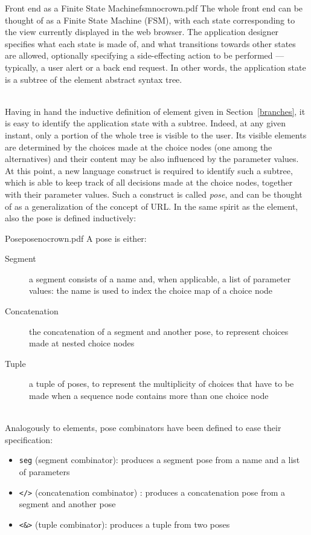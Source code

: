 \documentclass[12pt]{article} %
\newcommand{\be}{back end}
\newcommand{\fe}{front end}
\newcommand{\Fe}{Front end}
\newcommand{\wb}{web browser}
\newcommand{\abs}{abstract syntax tree}
\newcommand{\myverb}[1]{\texttt{\footnotesize #1}}
\begin{document}
\begin{dce}{\Fe{} as a Finite State Machine}{fsm}{nocrown.pdf}
The whole \fe{} can be thought of as a Finite State Machine (FSM), with each state corresponding to the view currently displayed in the \wb{}. The application designer specifies what each state is made of, and what transitions towards other states are allowed, optionally specifying a side-effecting action to be performed --- typically, a user alert or a \be{} request. In other words, the application state is a subtree of the element \abs{}.
\end{dce}
~\\
Having in hand the inductive definition of element given in Section~\ref{branches}, it is easy to identify the application state with a subtree. Indeed, at any given instant, only a portion of the whole tree is visible to the user. Its visible elements are determined by the choices made at the choice nodes (one among the alternatives) and their content may be also influenced by the parameter values. 
At this point, a new language construct is required to identify such a subtree, which is able to keep track of all decisions made at the choice nodes, together with their parameter values. Such a construct is called \emph{pose}, and can be thought of as a generalization of the concept of URL. In the same spirit as the element, also the pose is defined inductively:\\
\begin{dce}{Pose}{pose}{nocrown.pdf}
A pose is either:
\begin{description}
\item[Segment] a segment consists of a name and, when applicable, a list of parameter values: the name is used to index the choice map of a choice node
\item[Concatenation] the concatenation of a segment and another pose, to represent choices made at nested choice nodes
\item[Tuple] a tuple of poses, to represent the multiplicity of choices that have to be made when a sequence node contains more than one choice node
\end{description}
\end{dce}
~\\
Analogously to elements, pose combinators have been defined to ease their specification:
\begin{itemize}
\item \myverb{seg} (segment combinator): produces a segment pose from a name and a list of parameters
\item \myverb{</>} (concatenation combinator) : produces a concatenation pose from a segment and another pose
\item \myverb{<\&>} (tuple combinator): produces a tuple from two poses
\end{itemize}
\end{document}
